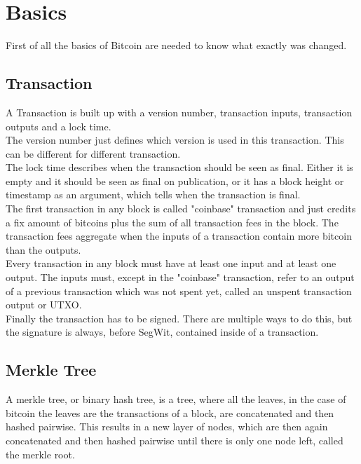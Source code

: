 
\section{Basics}
\label{ch:Basics}

First of all the basics of Bitcoin are needed to know what exactly was changed. 

\subsection{Transaction}
\label{sec:Introduction:Basics:Transaction}

A Transaction is built up with a version number, transaction inputs, transaction outputs and a lock time. \\
The version number just defines which version is used in this transaction. This can be different for different transaction. \\
The lock time describes when the transaction should be seen as final. Either it is empty and it should be seen as final on publication, or it has a block height or timestamp as an argument, which tells when the transaction is final. \\
The first transaction in any block is called "coinbase" transaction and just credits a fix amount of bitcoins plus the sum of all transaction fees in the block. The transaction fees aggregate when the inputs of a transaction contain more bitcoin than the outputs. \\
Every transaction in any block must have at least one input and at least one output. The inputs must, except in the "coinbase" transaction, refer to an output of a previous transaction which was not spent yet, called an unspent transaction output or UTXO. \\
Finally the transaction has to be signed. There are multiple ways to do this, but the signature is always, before SegWit, contained inside of a transaction.


\subsection{Merkle Tree}

A merkle tree, or binary hash tree, is a tree, where all the leaves, in the case of bitcoin the leaves are the transactions of a block, are concatenated and then hashed pairwise. This results in a new layer of nodes, which are then again concatenated and then hashed pairwise until there is only one node left, called the merkle root.


